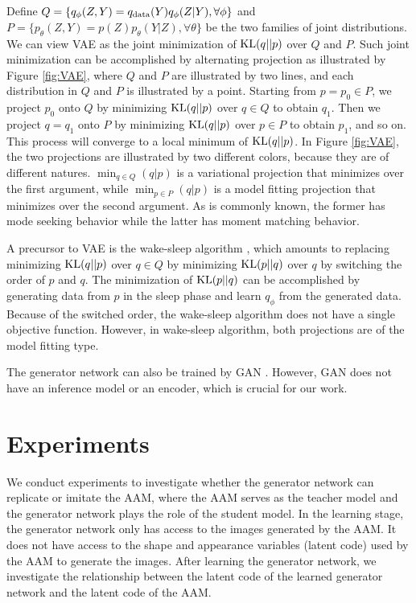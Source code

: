 \documentclass{article}
\begin{document}
Define $Q = \{ q_\phi(Z, Y) = q_{\rm data}(Y) q_\phi(Z|Y), \forall \phi\}$ and $P = \{ p_\theta(Z, Y) =  p(Z) p_\theta(Y|Z), \forall \theta\}$ be the two families of joint distributions. We can view VAE as the joint minimization of ${\rm KL}(q||p)$ over $Q$ and $P$. Such joint minimization can be accomplished by alternating projection as illustrated by Figure \ref{fig:VAE}, where $Q$ and $P$ are illustrated by two lines, and each distribution in $Q$ and $P$ is illustrated by a point. Starting from $p = p_0 \in P$, we project $p_0$ onto $Q$ by minimizing ${\rm KL}(q||p)$ over $q \in Q$ to obtain $q_1$. Then we project $q = q_1$ onto $P$ by minimizing ${\rm KL}(q||p)$ over $p \in P$ to obtain $p_1$, and so on. This process will converge to a local minimum of ${\rm KL}(q||p)$.
In Figure \ref{fig:VAE}, the two projections are illustrated by two different colors, because they are of different natures. $\min_{q\in Q}(q|p)$ is a variational projection that minimizes over the first argument, while  $\min_{p \in P}(q|p)$ is a model fitting projection that minimizes over the second argument. As is commonly known, the former has mode seeking behavior while the latter has moment matching behavior.

A precursor to VAE is the wake-sleep algorithm  \cite{hinton1995wake}, which amounts to replacing minimizing ${\rm KL}(q||p)$ over $q \in Q$ by minimizing ${\rm KL}(p||q)$ over $q$ by switching the order of $p$ and $q$. The minimization of ${\rm KL}(p||q)$ can be accomplished by generating data from $p$ in the sleep phase and learn $q_\phi$ from the generated data. Because of the switched order, the wake-sleep algorithm does not have a single objective function. However, in wake-sleep algorithm, both projections are of the model fitting type.

The generator network can also be trained by GAN \cite{goodfellow2014generative}. However, GAN does not have an inference model or an encoder, which is crucial for our work.




\section{Experiments} \label{sec:exp} %

We conduct experiments to investigate whether the generator network can replicate or imitate the AAM, where the AAM serves as the teacher model and the generator network plays the role of the student model. In the learning stage, the generator network only has access to the images generated by the AAM. It does not have access to the shape and appearance variables (latent code) used by the AAM to generate the images. After learning the generator network, we investigate the relationship between the latent code of the learned generator network and the latent code of the AAM.
\end{document}
